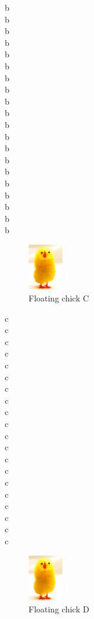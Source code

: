 \documentclass[12pt]{article}
\begin{document}
    b \\ b \\ b \\ b\\ b \\ b \\ b \\ b \\ b\\ b \\
    b \\ b \\ b \\ b\\ b \\ b \\ b \\ b \\ b\\ b \\

    \begin{figure}
      \includegraphics[height=2cm]{image.png}
      \caption{Floating chick C}
    \end{figure}

    c \\ c \\ c \\ c\\ c \\ c \\ c \\ c \\ c\\ c \\
    c \\ c \\ c \\ c\\ c \\ c \\ c \\ c \\ c\\ c \\

    \begin{figure}
      \includegraphics[height=2cm]{image.png}
      \caption{Floating chick D}
    \end{figure}
\end{document}
